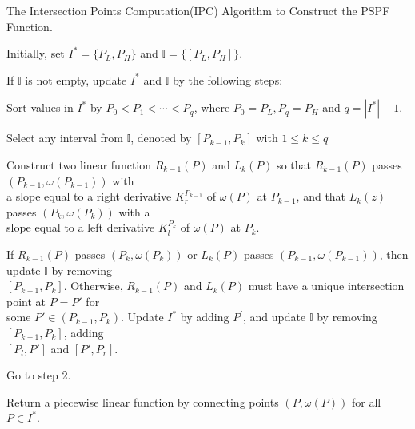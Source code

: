 \documentclass[UTF8]{article}
\begin{document}
\begin{algorithm}[h]\label{algoIPC}
\caption{The Intersection Points Computation(IPC) Algorithm to Construct the PSPF Function.}
\begin{algorithmic}[1]

\begin{description}
  \justifying
  \item[Step 1.] Initially, set $I^*=\{P_L,P_H\}$ and $\mathbb{I}= \{[P_L,P_H]\}$.
  \item[Step 2.] If $\mathbb{I}$ is not empty, update $I^*$ and $\mathbb{I}$ by the following steps:
  \item[Step 3.] Sort values in $I^*$ by $P_0<P_1<\cdots<P_q$, where $P_0 = P_L,P_q = P_H$ and $q = |I^*|-1$.
  \item[Step 4.]
  Select any interval from $\mathbb{I}$, denoted by $[P_{k-1},P_{k}]$ with $1\leq k \leq q$
  \item[Step 5.]
  Construct two linear function $ R_{k-1}(P)$ and $ L_{k}(P)$ so that $ R_{k-1}(P)$ passes $(P_{k-1},\omega(P_{k-1}))$ with \\
  \vspace{10pt}
  a slope equal to a right derivative $K_{r}^{P_{k-1}}$ of $\omega(P)$ at $P_{k-1}$, and that $L_{k}(z)$ passes $(P_{k},\omega(P_{k}))$ with a \\
  \vspace{10pt}
  slope equal to a left derivative $K_{l}^{P_{k}}$
  of $\omega(P)$ at $P_k$.
  \item[Step 6.] If $R_{k-1}(P)$ passes $(P_{k},\omega(P_{k}))$ or $L_{k}(P)$ passes $(P_{k-1},\omega(P_{k-1}))$, then update $\mathbb{I}$ by removing \\

  $[P_{k-1},P_{k}]$. Otherwise, $R_{k-1}(P)$ and $L_{k}(P)$ must have a unique intersection point at $P=P'$ for  \\
  \vspace{10pt}
  some $P' \in (P_{k-1},P_{k})$.
  Update $I^*$ by adding $P^'$, and update $\mathbb{I}$ by removing $[P_{k-1},P_{k}]$, adding \\
  \vspace{10pt}
  $[P_l,P']$ and $[P',P_r]$.
  \item[Step 7.] Go to step 2.
  \item[Step 8.] Return a piecewise linear function by connecting points $(P,\omega(P))$ for all $P \in I^*$.

\end{description}

\end{algorithmic}
\end{algorithm}
\end{document}

